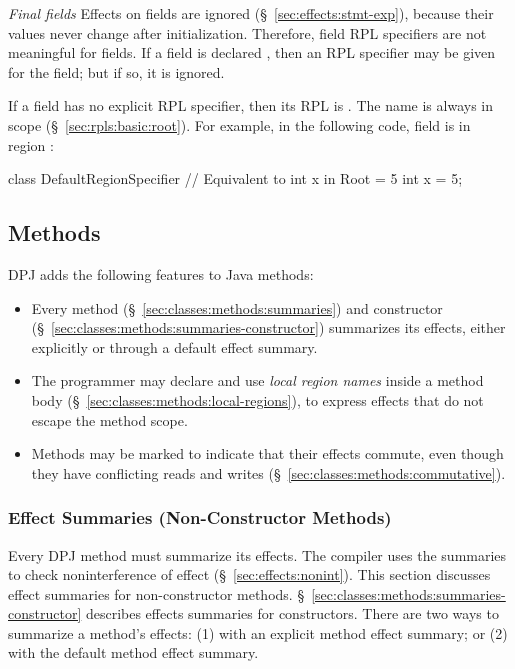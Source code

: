 \emph{Final fields} Effects on  fields are ignored
(\S~\ref{sec:effects:stmt-exp}), because their values never change
after initialization.  Therefore, field RPL specifiers are not
meaningful for  fields.  If a field is declared
, then an RPL specifier may be given for the field; but if
so, it is ignored.

 If a field has no explicit RPL specifier,
then its RPL is .  The name  is always in scope
(\S~\ref{sec:rpls:basic:root}).  For example, in the following code,
field  is in region :
%
\begin{dpjlisting}
class DefaultRegionSpecifier {
    // Equivalent to int x in Root = 5
    int x = 5;
}
\end{dpjlisting}


\subsection{Methods%
\label{sec:classes:methods}}

DPJ adds the following features to Java methods:
%
\begin{itemize}
%
\item Every method (\S~\ref{sec:classes:methods:summaries}) and
  constructor (\S~\ref{sec:classes:methods:summaries-constructor})
  summarizes its effects, either explicitly or through a default
  effect summary.
%
\item The programmer may declare and use \emph{local region names}
  inside a method body (\S~\ref{sec:classes:methods:local-regions}),
  to express effects that do not escape the method scope.
%
\item Methods may be marked  to indicate that their
  effects commute, even though they have conflicting reads and writes
  (\S~\ref{sec:classes:methods:commutative}).
%
\end{itemize}

\subsubsection{Effect Summaries (Non-Constructor Methods)%
\label{sec:classes:methods:summaries}}

Every DPJ method must summarize its effects.  The compiler uses the
summaries to check noninterference of effect
(\S~\ref{sec:effects:nonint}).  This section discusses effect
summaries for non-constructor methods.
\S~\ref{sec:classes:methods:summaries-constructor} describes effects
summaries for constructors.  There are two ways to summarize a
method's effects: (1) with an explicit method effect summary; or (2)
with the default method effect summary.

